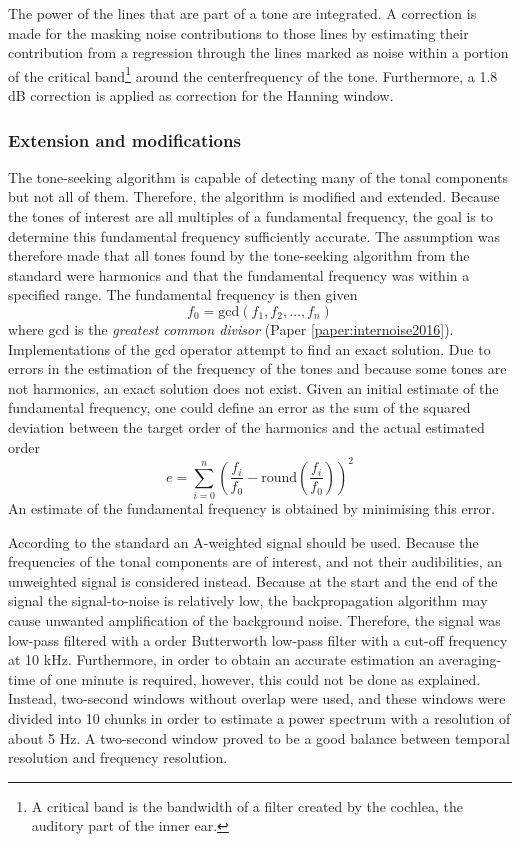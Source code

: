 The power of the lines that are part of a tone are integrated. A correction is
made for the masking noise contributions to those lines by estimating their
contribution from a regression through the lines marked as noise within a
portion of the critical band\footnote{A critical band is the bandwidth of a
filter created by the cochlea, the auditory part of the inner ear.} around the
centerfrequency of the tone. Furthermore, a 1.8 dB correction is applied as
correction for the Hanning window.

\subsubsection*{Extension and modifications}
The tone-seeking algorithm is capable of detecting many of the tonal components
but not all of them. Therefore, the algorithm is modified and extended.
Because the tones of interest are all multiples of a
fundamental frequency, the goal is to determine this fundamental frequency
sufficiently accurate. The assumption was therefore made that all tones found by the
tone-seeking algorithm from the standard were harmonics and that the fundamental
frequency was within a specified range.
The fundamental frequency is then given
\begin{equation}
 f_{0} = \mathrm{gcd}\left(f_1, f_2, \dots, f_n \right)
\end{equation}
where $\mathrm{gcd}$ is the \emph{greatest common divisor} (Paper \ref{paper:internoise2016}).
Implementations of the $\mathrm{gcd}$ operator attempt to find an exact solution.
Due to errors in the estimation of the frequency of the tones and because some tones are
not harmonics, an exact solution does not exist. Given an initial estimate of
the fundamental frequency, one could define an error as the sum of the squared
deviation between the target order of the harmonics and the actual estimated
order
\begin{equation}\label{eq:tool:features:error}
 e = \sum_{i=0}^{n} \left( \frac{f_i}{f_0} - \mathrm{round}\left(\frac{f_i}{f_0}\right) \right)^2
\end{equation}
An estimate of the fundamental frequency is obtained by minimising this error.

According to the standard an A-weighted signal should be used. Because the
frequencies of the tonal components are of interest, and not their audibilities,
an unweighted signal is considered instead. Because at the start and the end of
the signal the signal-to-noise is relatively low, the backpropagation algorithm
may cause unwanted amplification of the background noise. Therefore, the signal
was low-pass filtered with a  order Butterworth low-pass filter with a
cut-off frequency at 10 kHz. Furthermore, in order to obtain an accurate
estimation an averaging-time of one minute is required, however, this could not
be done as explained. Instead, two-second windows without overlap were used, and
these windows were divided into 10 chunks in order to estimate a power spectrum
with a resolution of about 5 Hz. A two-second window proved to be a good balance
between temporal resolution and frequency resolution.

